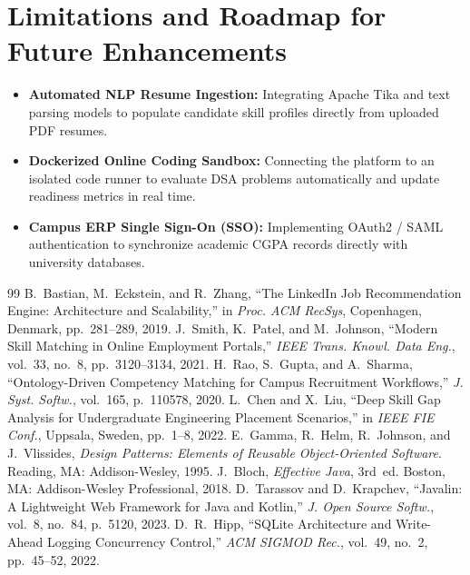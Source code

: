 \documentclass[11pt,a4paper]{report}
\begin{document}
\section{Limitations and Roadmap for Future Enhancements}
\begin{itemize}
    \item \textbf{Automated NLP Resume Ingestion:} Integrating Apache Tika and text parsing models to populate candidate skill profiles directly from uploaded PDF resumes.
    \item \textbf{Dockerized Online Coding Sandbox:} Connecting the platform to an isolated code runner to evaluate DSA problems automatically and update readiness metrics in real time.
    \item \textbf{Campus ERP Single Sign-On (SSO):} Implementing OAuth2 / SAML authentication to synchronize academic CGPA records directly with university databases.
\end{itemize}

\begin{thebibliography}{99}
\small
{} B.~Bastian, M.~Eckstein, and R.~Zhang, ``The LinkedIn Job Recommendation Engine: Architecture and Scalability,'' in \emph{Proc. ACM RecSys}, Copenhagen, Denmark, pp.~281--289, 2019.
 J.~Smith, K.~Patel, and M.~Johnson, ``Modern Skill Matching in Online Employment Portals,'' \emph{IEEE Trans. Knowl. Data Eng.}, vol.~33, no.~8, pp.~3120--3134, 2021.
 H.~Rao, S.~Gupta, and A.~Sharma, ``Ontology-Driven Competency Matching for Campus Recruitment Workflows,'' \emph{J. Syst. Softw.}, vol.~165, p.~110578, 2020.
 L.~Chen and X.~Liu, ``Deep Skill Gap Analysis for Undergraduate Engineering Placement Scenarios,'' in \emph{IEEE FIE Conf.}, Uppsala, Sweden, pp.~1--8, 2022.
 E.~Gamma, R.~Helm, R.~Johnson, and J.~Vlissides, \emph{Design Patterns: Elements of Reusable Object-Oriented Software}. Reading, MA: Addison-Wesley, 1995.
 J.~Bloch, \emph{Effective Java}, 3rd~ed. Boston, MA: Addison-Wesley Professional, 2018.
 D.~Tarassov and D.~Krapchev, ``Javalin: A Lightweight Web Framework for Java and Kotlin,'' \emph{J. Open Source Softw.}, vol.~8, no.~84, p.~5120, 2023.
 D.~R.~Hipp, ``SQLite Architecture and Write-Ahead Logging Concurrency Control,'' \emph{ACM SIGMOD Rec.}, vol.~49, no.~2, pp.~45--52, 2022.
\end{thebibliography}
\end{document}
